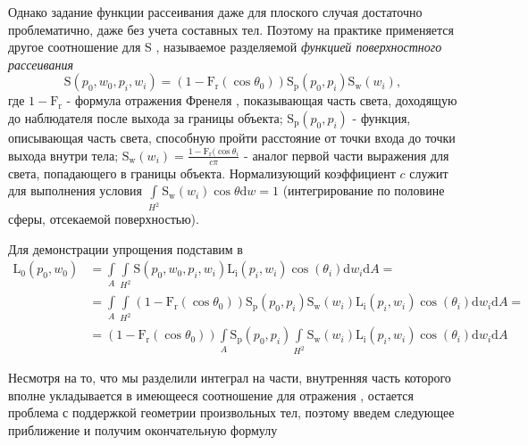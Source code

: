 Однако задание функции рассеивания даже для плоского случая достаточно
проблематично, даже без учета составных тел. Поэтому на практике применяется
другое соотношение для S , называемое разделяемой \emph{функцией поверхностного
рассеивания}
\begin{equation} \label{math:separable_bssrdf}
    \mathrm{S}(p_0, w_0, p_i, w_i) = (1 - \mathrm{F_r}(\cos\theta_0))
                                     \mathrm{S_p}(p_0, p_i) \mathrm{S_w}(w_i),
\end{equation}
где $1 - \mathrm{F_r}$ - формула отражения Френеля ,
показывающая часть света, доходящую до наблюдателя после выхода за границы
объекта; $\mathrm{S_p}(p_0, p_i)$ - функция, описывающая часть света, способную
пройти расстояние от точки входа до точки выхода внутри тела;
$\mathrm{S_w}(w_i) = \frac{1 - \mathrm{F_r}(\cos\theta_i}{c \pi}$ - аналог
первой части выражения для света, попадающего в границы объекта. Нормализующий
коэффициент $c$ служит для выполнения условия
$\int\limits_{{H^2}^{}} \mathrm{S_w}(w_i) \cos\theta \mathrm{d} w = 1$
(интегрирование по половине сферы, отсекаемой поверхностью).

Для демонстрации упрощения подставим 
в 
\begin{align}
    \mathrm{L_0}(p_0, w_0) & = \int\limits_{A^{}} \int\limits_{{H^2}^{}}
                               \mathrm{S}(p_0, w_0, p_i, w_i)
                               \mathrm{L_i}(p_i, w_i) \cos(\theta_i)
                               \mathrm{d} w_i \mathrm{d} A = \nonumber \\
                           & = \int\limits_{A^{}} \int\limits_{{H^2}^{}}
                               (1 - \mathrm{F_r}(\cos\theta_0))
                               \mathrm{S_p}(p_0, p_i) \mathrm{S_w}(w_i)
                               \mathrm{L_i}(p_i, w_i) \cos(\theta_i)
                               \mathrm{d} w_i \mathrm{d} A = \nonumber \\
                           & = (1 - \mathrm{F_r}(\cos\theta_0))
                               \int\limits_{A^{}} \mathrm{S_p}(p_0, p_i)
                               \int\limits_{{H^2}^{}} \mathrm{S_w}(w_i)
                               \mathrm{L_i}(p_i, w_i) \cos(\theta_i)
                               \mathrm{d} w_i \mathrm{d} A
\end{align}

Несмотря на то, что мы разделили интеграл на части, внутренняя часть
которого вполне укладывается в имеющееся соотношение для отражения
, остается проблема с поддержкой геометрии
произвольных тел, поэтому введем следующее приближение и получим окончательную
формулу

